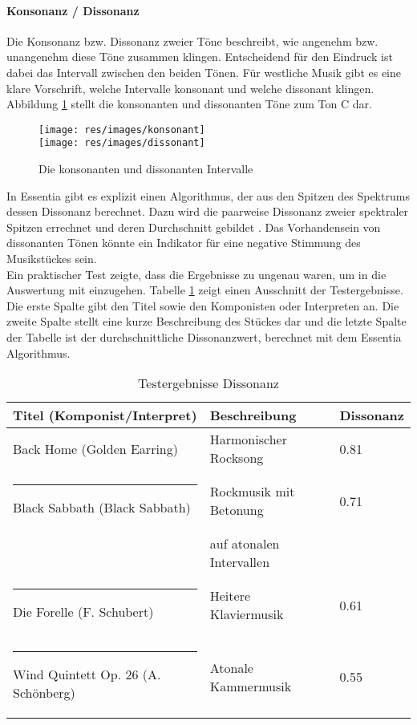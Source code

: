 \documentclass[11pt,a4paper]{article}
\begin{document}
\paragraph{Konsonanz / Dissonanz}
Die Konsonanz bzw. Dissonanz zweier Töne beschreibt, wie angenehm bzw. unangenehm diese Töne zusammen klingen. Entscheidend für den Eindruck ist dabei das Intervall zwischen den beiden Tönen. Für westliche Musik gibt es eine klare Vorschrift, welche Intervalle konsonant und welche dissonant klingen. Abbildung \ref{fig:KonDisIntervalle} stellt die konsonanten und dissonanten Töne zum Ton C dar.
\begin{figure}[ht]
\texttt{[image: res/images/konsonant]}
\vspace{5pt}\\
\texttt{[image: res/images/dissonant]}
\caption[Konsonante und Dissonante Intervalle]{Die konsonanten und dissonanten Intervalle \cite{89a5aac0af37ff45f55cd59468ed3b0a5f30cbb229bb691b7970477c14dbe1af}}
\label{fig:KonDisIntervalle}
\end{figure}
In Essentia gibt es explizit einen Algorithmus, der aus den Spitzen des Spektrums dessen Dissonanz berechnet. Dazu wird die paarweise Dissonanz zweier spektraler Spitzen errechnet und deren Durchschnitt gebildet \cite{EssentiaDissonance}. Das Vorhandensein von dissonanten Tönen könnte ein Indikator für eine negative Stimmung des Musikstückes sein.\\
Ein praktischer Test zeigte, dass die Ergebnisse zu ungenau waren, um in die Auswertung mit einzugehen. Tabelle \ref{tab:DissonanzTestergebnisse} zeigt einen Ausschnitt der Testergebnisse. Die erste Spalte gibt den Titel sowie den Komponisten oder Interpreten an. Die zweite Spalte stellt eine kurze Beschreibung des Stückes dar und die letzte Spalte der Tabelle ist der durchschnittliche Dissonanzwert, berechnet mit dem Essentia Algorithmus.
\begin{center}
\begin{table}[!ht]
\begin{tabular}{l | l | l}
\textbf{Titel (Komponist/Interpret)} & \textbf{Beschreibung} & \textbf{Dissonanz} \\
\hline
Back Home (Golden Earring) & Harmonischer Rocksong & 0.81 \\
\rule{-3pt}{3ex}
Black Sabbath (Black Sabbath) & Rockmusik mit Betonung & 0.71 \\
 &  auf atonalen Intervallen & \\
 \rule{-3pt}{3ex}
Die Forelle (F. Schubert) & Heitere Klaviermusik & 0.61 \\
\rule{-3pt}{3ex}
Wind Quintett Op. 26 (A. Schönberg) & Atonale Kammermusik & 0.55 \\
\end{tabular}
\caption[Testergebnisse Dissonanz]{Testergebnisse Dissonanz}
\label{tab:DissonanzTestergebnisse}
\end{table}
\end{center}
\end{document}
